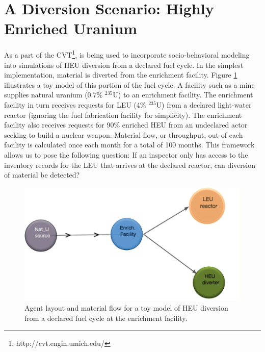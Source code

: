 \section{A Diversion Scenario: Highly Enriched Uranium}
\label{s_results}
As a part of the \gls{CVT}\footnote{http://cvt.engin.umich.edu/}, \Cyclus is being used to incorporate socio-behavioral modeling into simulations of \gls{HEU} diversion from a declared fuel cycle.  In the simplest implementation, material is diverted from the enrichment facility.  Figure \ref{fig:heu_layout} illustrates a toy model of this portion of the fuel cycle. A facility such as a mine supplies natural uranium (0.7\% $^{235}$U) to an enrichment facility.  The enrichment facility in turn receives requests for  \gls{LEU} (4\% $^{235}$U) from a declared light-water reactor (ignoring the fuel fabrication facility for simplicity).  The enrichment facility also receives requests for 90\% enriched \gls{HEU} from an undeclared actor seeking to build a nuclear weapon. Material flow, or throughput, out of each facility is calculated once each month for a total of 100 months.  This framework allows us to pose the following question: If an inspector only has access to the inventory records for the \gls{LEU} that arrives at the declared reactor, can diversion of material be detected?

\begin{figure}%
\begin{center}
\includegraphics[natwidth=162bp,natheight=227bp, scale=0.7]{./figs/heu_cyclist_layout.png}
\end{center}
\caption{Agent layout and material flow for a toy model of \gls{HEU} diversion from a declared fuel cycle at the enrichment facility.}
\label{fig:heu_layout}
\end{figure}

